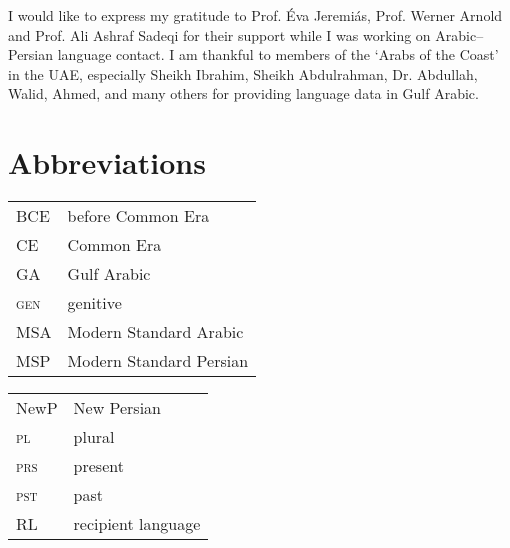 \documentclass[output=paper]{langsci/langscibook}
\begin{document}
I would like to express my gratitude to Prof. Éva Jeremiás, Prof. Werner Arnold and Prof. Ali Ashraf Sadeqi for their support while I was working on {Arabic}–Persian language contact. I am thankful to members of the ‘Arabs of the Coast’ in the UAE, especially Sheikh Ibrahim, Sheikh Abdulrahman, Dr. Abdullah, Walid, Ahmed, and many others for providing language data in Gulf Arabic.

\section*{Abbreviations}
\begin{tabularx}{.5\textwidth}[t]{@{}lQ@{}}
BCE & before Common Era\\
CE & Common Era\\
GA & Gulf {Arabic}\\
\textsc{gen}   &  genitive\\
{MSA} &  Modern Standard {Arabic}\\
{MSP}  &  Modern Standard Persian\\
\end{tabularx}%
\begin{tabularx}{.5\textwidth}[t]{@{}lQ@{}}
NewP   &  {New Persian}\\
\textsc{pl}   &  plural\\
\textsc{prs}   &  present\\
\textsc{pst}   &  past\\
{RL} &  {recipient language} \\
\end{tabularx}%


{\sloppy\printbibliography[heading=subbibliography,notkeyword=this]}
\end{document}
